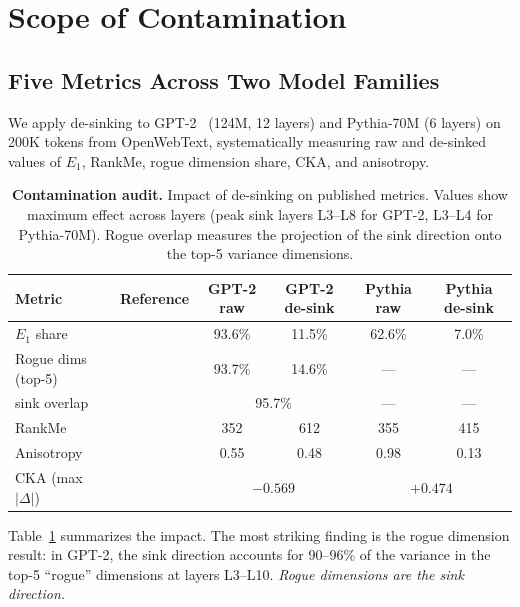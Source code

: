 \documentclass[11pt]{article}
\begin{document}
\section{Scope of Contamination}\label{sec:scope}

\subsection{Five Metrics Across Two Model Families}\label{sec:fivemetrics}

We apply de-sinking to GPT-2~\citep{radford2019language} (124M, 12 layers) and Pythia-70M (6 layers) on 200K tokens from OpenWebText, systematically measuring raw and de-sinked values of $E_1$, RankMe, rogue dimension share, CKA, and anisotropy.

\begin{table}[t]
\centering
\caption{\textbf{Contamination audit.} Impact of de-sinking on published metrics. Values show maximum effect across layers (peak sink layers L3--L8 for GPT-2, L3--L4 for Pythia-70M). Rogue overlap measures the projection of the sink direction onto the top-5 variance dimensions.}
\label{tab:audit}
\small
\begin{tabular}{@{}llcccc@{}}
\toprule
\textbf{Metric} & \textbf{Reference} & \textbf{GPT-2 raw} & \textbf{GPT-2 de-sink} & \textbf{Pythia raw} & \textbf{Pythia de-sink} \\
\midrule
$E_1$ share & \citet{li2024geometric} & 93.6\% & 11.5\% & 62.6\% & 7.0\% \\
Rogue dims (top-5) & \citet{timkey2021all} & 93.7\% & 14.6\% & --- & --- \\
\quad sink overlap & & \multicolumn{2}{c}{95.7\%} & --- & --- \\
RankMe & \citet{garrido2023rankme} & 352 & 612 & 355 & 415 \\
Anisotropy & \citet{ethayarajh2019contextual} & 0.55 & 0.48 & 0.98 & 0.13 \\
CKA (max $|\Delta|$) & \citet{raghu2021vision} & \multicolumn{2}{c}{$-0.569$} & \multicolumn{2}{c}{$+0.474$} \\
\bottomrule
\end{tabular}
\end{table}

Table~\ref{tab:audit} summarizes the impact. The most striking finding is the rogue dimension result: in GPT-2, the sink direction accounts for 90--96\% of the variance in the top-5 ``rogue'' dimensions at layers L3--L10. \emph{Rogue dimensions are the sink direction.}
\end{document}
